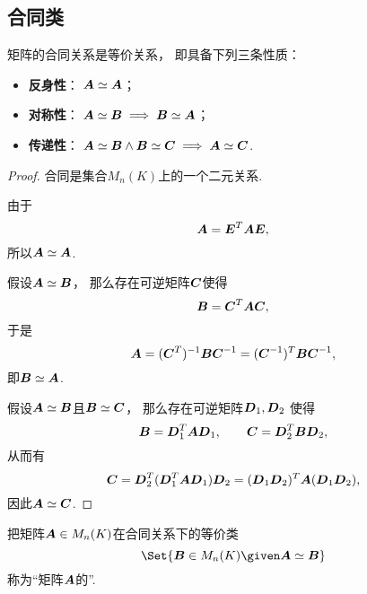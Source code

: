 \subsection{合同类}
\begin{property}\label{theorem:矩阵合同.合同关系是等价关系}
矩阵的合同关系是等价关系，
即具备下列三条性质：\begin{itemize}
	\item {\rm\bf 反身性}：
	\(\boldsymbol{A}\simeq\boldsymbol{A}\)；
	\item {\rm\bf 对称性}：
	\(\boldsymbol{A}\simeq\boldsymbol{B} \implies \boldsymbol{B}\simeq\boldsymbol{A}\)；
	\item {\rm\bf 传递性}：
	\(\boldsymbol{A}\simeq\boldsymbol{B} \land \boldsymbol{B}\simeq\boldsymbol{C} \implies \boldsymbol{A}\simeq\boldsymbol{C}\).
\end{itemize}
\begin{proof}
合同是集合\(M_n(K)\)上的一个二元关系.

由于\begin{equation*}
	\boldsymbol{A} = \boldsymbol{E}^T \boldsymbol{A} \boldsymbol{E},
\end{equation*}
所以\(\boldsymbol{A} \simeq \boldsymbol{A}\).

假设\(\boldsymbol{A} \simeq \boldsymbol{B}\)，
那么存在可逆矩阵\(\boldsymbol{C}\)使得\begin{equation*}
	\boldsymbol{B}=\boldsymbol{C}^T\boldsymbol{A}\boldsymbol{C},
\end{equation*}
于是\begin{equation*}
	\boldsymbol{A}=(\boldsymbol{C}^T)^{-1}\boldsymbol{B}\boldsymbol{C}^{-1}
	=(\boldsymbol{C}^{-1})^T\boldsymbol{B}\boldsymbol{C}^{-1},
\end{equation*}
即\(\boldsymbol{B} \simeq \boldsymbol{A}\).

假设\(\boldsymbol{A} \simeq \boldsymbol{B}\)且\(\boldsymbol{B} \simeq \boldsymbol{C}\)，
那么存在可逆矩阵\(\boldsymbol{D}_1,\boldsymbol{D}_2\)
使得\begin{equation*}
	\boldsymbol{B} = \boldsymbol{D}_1^T \boldsymbol{A} \boldsymbol{D}_1, \qquad
	\boldsymbol{C} = \boldsymbol{D}_2^T \boldsymbol{B} \boldsymbol{D}_2,
\end{equation*}
从而有\begin{equation*}
	\boldsymbol{C} = \boldsymbol{D}_2^T (\boldsymbol{D}_1^T \boldsymbol{A} \boldsymbol{D}_1) \boldsymbol{D}_2
	= (\boldsymbol{D}_1 \boldsymbol{D}_2)^T \boldsymbol{A} (\boldsymbol{D}_1 \boldsymbol{D}_2),
\end{equation*}
因此\(\boldsymbol{A} \simeq \boldsymbol{C}\).
\end{proof}
\end{property}

\begin{definition}
把矩阵\(\boldsymbol{A} \in M_n(K)\)在合同关系下的等价类\begin{equation*}
	\Set{ \vb{B} \in M_n(K) \given \vb{A} \simeq \vb{B} }
\end{equation*}称为“矩阵\(\boldsymbol{A}\)的”.
\end{definition}

